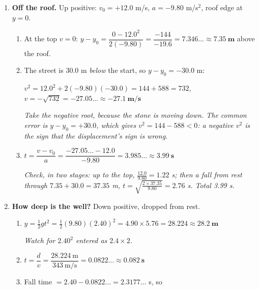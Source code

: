 \documentclass[12pt, twoside]{article}
\begin{document}
\begin{enumerate}[itemsep=0.5cm, start=9]
\begin{enumerate}[itemsep=0.3cm]
      \textbf{Why:} both covered 180 m in 30 s, so both had the same average
      velocity, 6.0 m/s. The train started from rest, so its average is
      $\bar{v} = \frac{0 + v}{2}$. For that to be 6.0 m/s, $v$ must be 12 m/s.

      \emph{This is a strong answer if the student uses the average velocity. Also
      credit ``it started slower, so it must end faster to catch up'', with the
      number.}
  \end{enumerate}

\newpage

\item \textbf{Off the roof.} Up positive: $v_0 = +12.0$ m/s, $a = -9.80$ m/s$^2$,
  roof edge at $y = 0$.
  \begin{enumerate}[itemsep=0.3cm]
    \item At the top $v = 0$: \quad $y - y_0 = \dfrac{0 - 12.0^2}{2(-9.80)} =
      \dfrac{-144}{-19.6} = 7.346\ldots \approx \mathbf{7.35~\textbf{m}}$ above the
      roof.
    \item The street is 30.0 m \emph{below} the start, so $y - y_0 = -30.0$ m:

      $v^2 = 12.0^2 + 2(-9.80)(-30.0) = 144 + 588 = 732$, \quad
      $v = -\sqrt{732} = -27.05\ldots \approx \mathbf{-27.1~\textbf{m/s}}$

      \emph{Take the negative root, because the stone is moving down. The common
      error is $y - y_0 = +30.0$, which gives $v^2 = 144 - 588 < 0$: a negative
      $v^2$ is the sign that the displacement's sign is wrong.}
    \item $t = \dfrac{v - v_0}{a} = \dfrac{-27.05\ldots - 12.0}{-9.80} =
      3.985\ldots \approx \mathbf{3.99~\textbf{s}}$

      \emph{Check, in two stages: up to the top, $\frac{12.0}{9.80} = 1.22$ s; then a
      fall from rest through $7.35 + 30.0 = 37.35$ m,
      $t = \sqrt{\frac{2 \times 37.35}{9.80}} = 2.76$ s. Total 3.99 s.}
  \end{enumerate}

\item \textbf{How deep is the well?} Down positive, dropped from rest.
  \begin{enumerate}[itemsep=0.3cm]
    \item $y = \tfrac{1}{2}gt^2 = \tfrac{1}{2}(9.80)(2.40)^2 = 4.90 \times 5.76 =
      28.224 \approx \mathbf{28.2~\textbf{m}}$

      \emph{Watch for $2.40^2$ entered as $2.4 \times 2$.}
    \item $t = \dfrac{d}{v} = \dfrac{28.224~\text{m}}{343~\text{m/s}} = 0.0822\ldots
      \approx \mathbf{0.082~\textbf{s}}$
    \item Fall time $= 2.40 - 0.0822\ldots = 2.3177\ldots$ s, so


\end{enumerate}
\end{enumerate}
\end{document}
